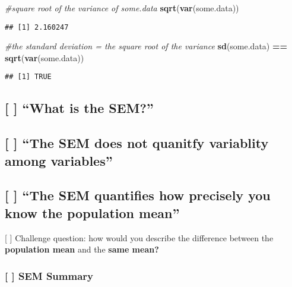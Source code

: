 \documentclass[]{book}
\newenvironment{Shaded}{\begin{snugshade}}{\end{snugshade}}
\newcommand{\KeywordTok}[1]{\textcolor[rgb]{0.13,0.29,0.53}{\textbf{#1}}}
\newcommand{\StringTok}[1]{\textcolor[rgb]{0.31,0.60,0.02}{#1}}
\newcommand{\CommentTok}[1]{\textcolor[rgb]{0.56,0.35,0.01}{\textit{#1}}}
\newcommand{\OperatorTok}[1]{\textcolor[rgb]{0.81,0.36,0.00}{\textbf{#1}}}
\newcommand{\NormalTok}[1]{#1}
\theoremstyle{definition}
\theoremstyle{definition}
\theoremstyle{definition}
\theoremstyle{remark}
\begin{document}
\begin{Shaded}
\begin{Highlighting}[]
\CommentTok{#square root of the variance of some.data}
\KeywordTok{sqrt}\NormalTok{(}\KeywordTok{var}\NormalTok{(some.data))}
\end{Highlighting}
\end{Shaded}

\begin{verbatim}
## [1] 2.160247
\end{verbatim}

\begin{Shaded}
\begin{Highlighting}[]
\CommentTok{#the standard deviation = the square root of the variance}
\KeywordTok{sd}\NormalTok{(some.data) }\OperatorTok{==}\StringTok{ }\KeywordTok{sqrt}\NormalTok{(}\KeywordTok{var}\NormalTok{(some.data))}
\end{Highlighting}
\end{Shaded}

\begin{verbatim}
## [1] TRUE
\end{verbatim}

\subsection{\texorpdfstring{{[} {]} ``What is the
SEM?''}{{[} {]} What is the SEM?}}\label{what-is-the-sem}

\subsection{\texorpdfstring{{[} {]} ``The SEM does not quanitfy
variablity among
variables''}{{[} {]} The SEM does not quanitfy variablity among variables}}\label{the-sem-does-not-quanitfy-variablity-among-variables}

\subsection{\texorpdfstring{{[} {]} ``The SEM quantifies how precisely
you know the population
mean''}{{[} {]} The SEM quantifies how precisely you know the population mean}}\label{the-sem-quantifies-how-precisely-you-know-the-population-mean}

{[} {]} Challenge question: how would you describe the difference
between the \textbf{population mean} and the \textbf{same mean?}

\subsubsection*{{[} {]} SEM Summary}\label{sem-summary}
\end{document}
